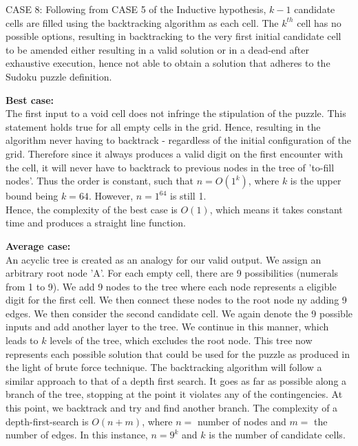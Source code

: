 \documentclass[12pt]{article}
\begin{document}
\begin{flushleft}
CASE 8: Following from CASE 5 of the Inductive hypothesis, $k-1$ candidate cells are filled using the backtracking algorithm as each cell. The $k^{th}$ cell has no possible options, resulting in backtracking to the very first initial candidate cell to be amended either resulting in a valid solution or in a dead-end after exhaustive execution, hence not able to obtain a solution that adheres to the Sudoku puzzle definition. 
\end{flushleft}
\begin{flushleft}
\textbf{Best case:}\\
The first input to a void cell does not infringe the stipulation of the puzzle. This statement holds true for all empty cells in the grid. Hence, resulting in the algorithm never having to backtrack - regardless of the initial configuration of the grid. Therefore since it always produces a valid digit on the first encounter with the cell, it will never have to backtrack to previous nodes in the tree of 'to-fill nodes'. Thus the order is constant, such that $n = O(1^k) $, where $k$ is the upper bound being $k = 64$. However, $n = 1^64$ is still 1. \\
Hence, the complexity of the best case is  $O(1)$, which means it takes constant time and produces a straight line function.
\end{flushleft}
\begin{flushleft}
\textbf{Average case:}\\
An acyclic tree is created as an analogy for our valid output. We assign an arbitrary root node 'A'. For each empty cell, there are 9 possibilities (numerals from 1 to 9). We add 9 nodes to the tree where each node represents a eligible digit for the first cell. We then connect these nodes to the root node ny adding 9 edges. We then consider the second candidate cell. We again denote the 9 possible inputs and add another layer to the tree. We continue in this manner, which leads to $k$ levels of the tree, which excludes the root node. This tree now represents each possible solution that could be used for the puzzle as produced in the light of brute force technique. The backtracking algorithm will follow a  similar approach to that of a depth first search. It goes as far as possible along a branch of the tree, stopping at the point it violates any of the contingencies. At this point, we backtrack and try and find another branch. The complexity of a depth-first-search is $O(n+m)$, where $n = $ number of nodes and $m = $ the number of edges. In this instance, $n = 9^k$ and $k$ is the number of candidate cells.   
\end{flushleft}
\end{document}
